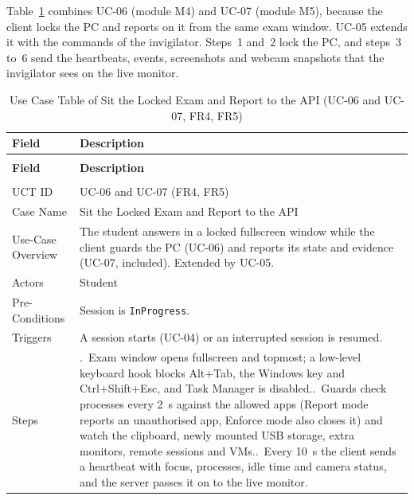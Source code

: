 Table~\ref{tab:uct_lockdown_telemetry} combines UC-06 (module M4) and UC-07 (module M5), because the client locks the PC and reports on it from the same exam window. UC-05 extends it with the commands of the invigilator. Steps~1 and~2 lock the PC, and steps~3 to~6 send the heartbeats, events, screenshots and webcam snapshots that the invigilator sees on the live monitor.

{\renewcommand{\arraystretch}{1.1}\setlength{\tabcolsep}{6pt}
\begin{longtable}{>{\small\raggedright\arraybackslash}p{3.3cm}>{\small\raggedright\arraybackslash}p{\dimexpr\textwidth-3.3cm-4\tabcolsep\relax}}
\caption{Use Case Table of Sit the Locked Exam and Report to the API (UC-06 and UC-07, FR4, FR5)}\label{tab:uct_lockdown_telemetry}\\ \hline\hline
\textbf{Field} & \textbf{Description} \\ \hline\hline
\endfirsthead
\multicolumn{2}{c}{\small\tablename~\thetable{} -- continued from previous page}\\ \hline\hline
\textbf{Field} & \textbf{Description} \\ \hline\hline
\endhead
\hline \multicolumn{2}{r}{\small Continued on next page}\\
\endfoot
\hline\hline
\endlastfoot
UCT ID & UC-06 and UC-07 (FR4, FR5) \\*
Case Name & Sit the Locked Exam and Report to the API \\*
Use-Case Overview & The student answers in a locked fullscreen window while the client guards the PC (UC-06) and reports its state and evidence (UC-07, included). Extended by UC-05. \\*
Actors & Student \\*
Pre-Conditions & Session is \texttt{InProgress}. \\*
Triggers & A session starts (UC-04) or an interrupted session is resumed. \\
Steps & 1.~Exam window opens fullscreen and topmost; a low-level keyboard hook blocks Alt+Tab, the Windows key and Ctrl+Shift+Esc, and Task Manager is disabled.\newline
2.~Guards check processes every 2~s against the allowed apps (Report mode reports an unauthorised app, Enforce mode also closes it) and watch the clipboard, newly mounted USB storage, extra monitors, remote sessions and VMs.\newline
3.~Every 10~s the client sends a heartbeat with focus, processes, idle time and camera status, and the server passes it on to the live monitor.\newline

\end{longtable}}
